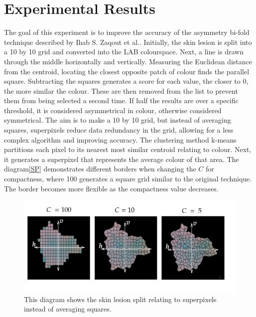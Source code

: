 \section{Experimental Results}
The goal of this experiment is to improve the accuracy of the asymmetry bi-fold technique described by Ihab S. Zaqout et al.\cite{Zaqout2016}. Initially, the skin lesion is split into a 10 by 10 grid and converted into the LAB colourspace. Next, a line is drawn through the middle horizontally and vertically. Measuring the Euclidean distance from the centroid, locating the closest opposite patch of colour finds the parallel square. Subtracting the squares generates a score for each value, the closer to 0, the more similar the colour. These are then removed from the list to prevent them from being selected a second time. If half the results are over a specific threshold, it is considered asymmetrical in colour, otherwise considered symmetrical. The aim is to make a 10 by 10 grid, but instead of averaging squares, superpixels reduce data redundancy in the grid, allowing for a less complex algorithm and improving accuracy. The clustering method k-means partitions each pixel to its nearest most similar centroid relating to colour. Next, it generates a superpixel that represents the average colour of that area. The diagram\ref{SP} demonstrates different borders when changing the $C$ for compactness, where 100 generates a square grid similar to the original technique. The border becomes more flexible as the compactness value decreases.

\begin{figure} 
\centering
\includegraphics[scale=0.6]{images/superpixels.png}
\caption{This diagram shows the skin lesion split relating to superpixels instead of averaging squares.}
\end{figure}\label{SP}

